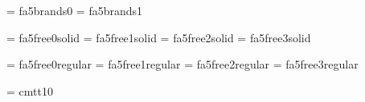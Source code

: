 
\font\fabrandszero = fa5brands0
\font\fabrandsone = fa5brands1
\def\fabrandszeroicon#1{{\fabrandszero\char"#1}}%
\def\fabrandsoneicon#1{{\fabrandsone\char"#1}}%

\font\fasolidzero = fa5free0solid
\font\fasolidone = fa5free1solid
\font\fasolidtwo = fa5free2solid
\font\fasolidthree = fa5free3solid
\def\fasolidzeroicon#1{{\fasolidzero\char"#1}}%
\def\fasolidoneicon#1{{\fasolidone\char"#1}}%
\def\fasolidtwoicon#1{{\fasolidtwo\char"#1}}%
\def\fasolidthreeicon#1{{\fasolidthree\char"#1}}%

\font\faregularzero = fa5free0regular
\font\faregularone = fa5free1regular
\font\faregulartwo = fa5free2regular
\font\faregularthree = fa5free3regular
\def\faregularzeroicon#1{{\faregularzero\char"#1}}%
\def\faregularoneicon#1{{\faregularone\char"#1}}%
\def\faregulartwoicon#1{{\faregulartwo\char"#1}}%
\def\faregularthreeicon#1{{\faregularthree\char"#1}}%

\font\tentt = cmtt10
\def\fontgroup#1{\leftline{\tentt #1}\noindent}


